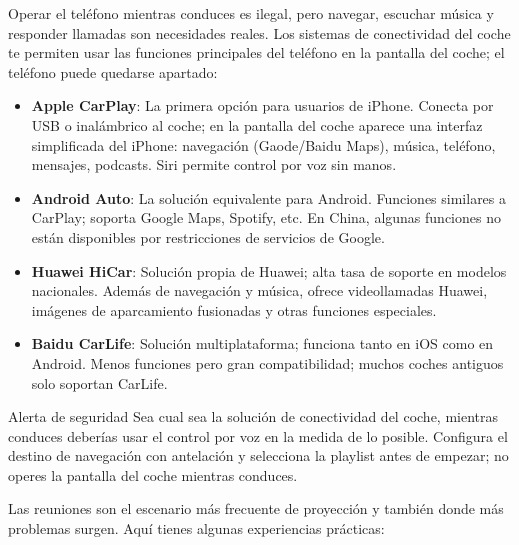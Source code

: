 
Operar el teléfono mientras conduces es ilegal, pero navegar, escuchar música y responder llamadas son necesidades reales. Los sistemas de conectividad del coche te permiten usar las funciones principales del teléfono en la pantalla del coche; el teléfono puede quedarse apartado:

\begin{itemize}
  \item \textbf{Apple CarPlay}: La primera opción para usuarios de iPhone. Conecta por USB o inalámbrico al coche; en la pantalla del coche aparece una interfaz simplificada del iPhone: navegación (Gaode/Baidu Maps), música, teléfono, mensajes, podcasts. Siri permite control por voz sin manos.
  \item \textbf{Android Auto}: La solución equivalente para Android. Funciones similares a CarPlay; soporta Google Maps, Spotify, etc. En China, algunas funciones no están disponibles por restricciones de servicios de Google.
  \item \textbf{Huawei HiCar}: Solución propia de Huawei; alta tasa de soporte en modelos nacionales. Además de navegación y música, ofrece videollamadas Huawei, imágenes de aparcamiento fusionadas y otras funciones especiales.
  \item \textbf{Baidu CarLife}: Solución multiplataforma; funciona tanto en iOS como en Android. Menos funciones pero gran compatibilidad; muchos coches antiguos solo soportan CarLife.
\end{itemize}

\begin{tcbwarn}{Alerta de seguridad}
Sea cual sea la solución de conectividad del coche, mientras conduces deberías usar el control por voz en la medida de lo posible. Configura el destino de navegación con antelación y selecciona la playlist antes de empezar; no operes la pantalla del coche mientras conduces.

\end{tcbwarn}


Las reuniones son el escenario más frecuente de proyección y también donde más problemas surgen. Aquí tienes algunas experiencias prácticas:

